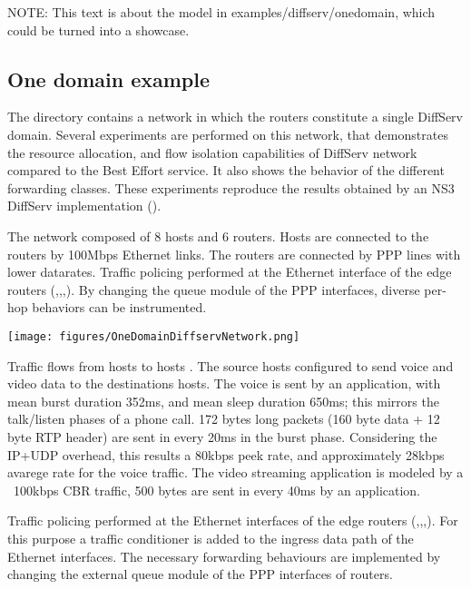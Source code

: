NOTE: This text is about the model in examples/diffserv/onedomain, which could be turned into a showcase.

\subsection{One domain example}

The  directory contains
a network in which the routers constitute a single DiffServ domain.
Several experiments are performed on this network, that demonstrates
the resource allocation, and flow isolation capabilities of DiffServ
network compared to the Best Effort service. It also shows the
behavior of the different forwarding classes. These experiments
reproduce the results obtained by an NS3 DiffServ implementation
(\cite{Sanjay2010}).

The network composed of 8 hosts and 6 routers.
Hosts are connected to the routers by 100Mbps Ethernet links. The
routers are connected by PPP lines with lower datarates.
Traffic policing performed at the Ethernet interface of the edge
routers (,,,). By changing
the queue module of the PPP interfaces, diverse per-hop behaviors
can be instrumented.

\begin{center}
\texttt{[image: figures/OneDomainDiffservNetwork.png]}
\end{center}

Traffic flows from hosts  to hosts . The source hosts
configured to send voice and video data to the destinations hosts. The voice
is sent by an  application, with mean burst duration
352ms, and mean sleep duration 650ms; this mirrors the talk/listen phases
of a phone call. 172 bytes long packets (160 byte data + 12 byte RTP header)
are sent in every 20ms in the burst phase. Considering the IP+UDP overhead,
this results a 80kbps peek rate, and approximately 28kbps avarege rate for
the voice traffic. The video streaming application is modeled by a ~100kbps
CBR traffic, 500 bytes are sent in every 40ms by an 
application.

Traffic policing performed at the Ethernet interfaces of the edge routers
(,,,). For this purpose a traffic conditioner
is added to the ingress data path of the Ethernet interfaces. The necessary
forwarding behaviours are implemented by changing the external queue module
of the PPP interfaces of routers.


